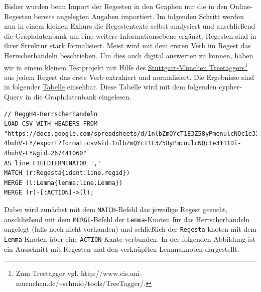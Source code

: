 Bisher wurden beim Import der Regesten in den Graphen nur die in den
Online-Regesten bereits angelegten Angaben importiert. Im folgenden
Schritt werden nun in einem kleinen Exkurs die Regestentexte selbst
analysiert und anschließend die Graphdatenbank um eine weitere
Informationsebene ergänzt. Regesten sind in ihrer Struktur stark
formalisiert. Meist wird mit dem ersten Verb im Regest das
Herrscherhandeln beschrieben. Um dies auch digital auswerten zu können,
haben wir in einem kleinen Testprojekt mit Hilfe des
\href{http://www.cis.uni-muenchen.de/~schmid/tools/TreeTagger/}{Stuttgart-München
Treetaggers}\footnote{Zum Treetagger vgl.
  http://www.cis.uni-muenchen.de/\textasciitilde schmid/tools/TreeTagger/.}
aus jedem Regest das erste Verb extrahiert und normalisiert. Die
Ergebnisse sind in folgender
\href{https://docs.google.com/spreadsheets/d/1nlbZmQYcT1E3Z58yPmcnulcNQc1e3111Di-4huhV-FY/edit?usp=sharing}{Tabelle}
einsehbar. Diese Tabelle wird mit dem folgenden cypher-Query in die
Graphdatenbank eingelesen.

\begin{verbatim}
// ReggH4-Herrscherhandeln
LOAD CSV WITH HEADERS FROM "https://docs.google.com/spreadsheets/d/1nlbZmQYcT1E3Z58yPmcnulcNQc1e3111Di-4huhV-FY/export?format=csv&id=1nlbZmQYcT1E3Z58yPmcnulcNQc1e3111Di-4huhV-FY&gid=267441060"
AS line FIELDTERMINATOR ','
MATCH (r:Regesta{ident:line.regid})
MERGE (l:Lemma{lemma:line.Lemma})
MERGE (r)-[:ACTION]->(l);
\end{verbatim}

Dabei wird zunächst mit dem \texttt{MATCH}-Befehl das jeweilige Regest
gesucht, anschließend mit dem \texttt{MERGE}-Befehl der
\texttt{Lemma}-Knoten für das Herrscherhandeln angelegt (falls noch
nicht vorhanden) und schließlich der \texttt{Regesta}-knoten mit dem
\texttt{Lemma}-Knoten über eine \texttt{ACTION}-Kante verbunden. In der
folgenden Abbildung ist ein Ausschnitt mit Regesten und den verknüpften
Lemmaknoten dargestellt.


